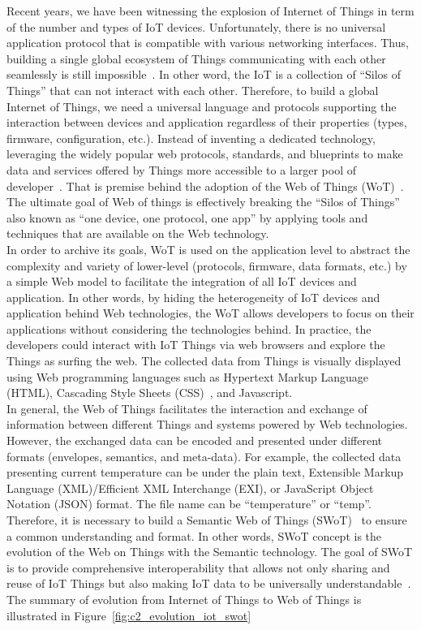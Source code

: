 Recent years, we have been witnessing the explosion of Internet of Things in term of the number and types of IoT devices. Unfortunately, there is no universal application protocol that is compatible with various networking interfaces. Thus, building a single global ecosystem of Things communicating with each other seamlessly is still impossible~\cite{WebofThi19:online}. In other word, the IoT is a collection of ``Silos of Things'' that can not interact with each other. Therefore, to build a global Internet of Things, we need a universal language and protocols supporting the interaction between devices and application regardless of their properties (types, firmware, configuration, etc.). Instead of inventing a dedicated technology, leveraging the widely popular web protocols, standards, and blueprints to make data and services offered by Things more accessible to a larger pool of developer~\cite{guinard2016building}. That is premise behind the adoption of the Web of Things (WoT)~. The ultimate goal of Web of things is effectively breaking the ``Silos of Things'' also known as ``one device, one protocol, one app'' by applying tools and techniques that are available on the Web technology.\\

In order to archive its goals, WoT is used on the application level to abstract the complexity and variety of lower-level (protocols, firmware, data formats, etc.) by a simple Web model to facilitate the integration of all IoT devices and application. In other words, by hiding the heterogeneity of IoT devices and application behind Web technologies, the WoT allows developers to focus on their applications without considering the technologies behind. In practice, the developers could interact with IoT Things via web browsers and explore the Things as surfing the web. The collected data from Things is visually displayed using Web programming languages such as Hypertext Markup Language (HTML), Cascading Style Sheets (CSS)~, and Javascript.\\ 

In general, the Web of Things facilitates the interaction and exchange of information between different Things and systems powered by Web technologies. However, the exchanged data can be encoded and presented under different formats (envelopes, semantics, and meta-data). For example, the collected data presenting current temperature can be under the plain text, Extensible Markup Language (XML)/Efficient XML Interchange (EXI), or JavaScript Object Notation (JSON) format. The file name can be ``temperature'' or ``temp''. Therefore, it is necessary to build a Semantic Web of Things (SWoT)~ to ensure a common understanding and format. In other words, SWoT concept is the evolution of the Web on Things with the Semantic technology. The goal of SWoT is to provide comprehensive interoperability that allows not only sharing and reuse of IoT Things but also making IoT data to be universally understandable~\cite{pfisterer2011spitfire}. The summary of evolution from Internet of Things to Web of Things is illustrated in Figure~\ref{fig:c2_evolution_iot_swot}

